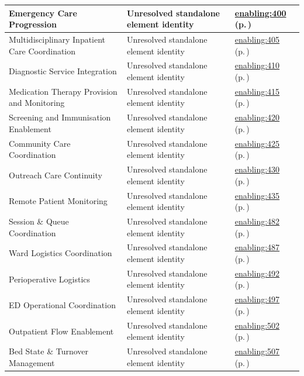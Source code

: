 \begin{longtable}{|>{\raggedright\arraybackslash}p{0.38\TableWidth}|>{\raggedright\arraybackslash}p{0.27\TableWidth}|>{\raggedright\arraybackslash}p{0.35\TableWidth}|}
Emergency Care Progression & Unresolved standalone element identity & \hyperref[rad:enabling:400]{enabling:400} (p.\,\pageref{rad:enabling:400})\\\hline
Multidisciplinary Inpatient Care Coordination & Unresolved standalone element identity & \hyperref[rad:enabling:405]{enabling:405} (p.\,\pageref{rad:enabling:405})\\\hline
Diagnostic Service Integration & Unresolved standalone element identity & \hyperref[rad:enabling:410]{enabling:410} (p.\,\pageref{rad:enabling:410})\\\hline
Medication Therapy Provision and Monitoring & Unresolved standalone element identity & \hyperref[rad:enabling:415]{enabling:415} (p.\,\pageref{rad:enabling:415})\\\hline
Screening and Immunisation Enablement & Unresolved standalone element identity & \hyperref[rad:enabling:420]{enabling:420} (p.\,\pageref{rad:enabling:420})\\\hline
Community Care Coordination & Unresolved standalone element identity & \hyperref[rad:enabling:425]{enabling:425} (p.\,\pageref{rad:enabling:425})\\\hline
Outreach Care Continuity & Unresolved standalone element identity & \hyperref[rad:enabling:430]{enabling:430} (p.\,\pageref{rad:enabling:430})\\\hline
Remote Patient Monitoring & Unresolved standalone element identity & \hyperref[rad:enabling:435]{enabling:435} (p.\,\pageref{rad:enabling:435})\\\hline
Session \& Queue Coordination & Unresolved standalone element identity & \hyperref[rad:enabling:482]{enabling:482} (p.\,\pageref{rad:enabling:482})\\\hline
Ward Logistics Coordination & Unresolved standalone element identity & \hyperref[rad:enabling:487]{enabling:487} (p.\,\pageref{rad:enabling:487})\\\hline
Perioperative Logistics & Unresolved standalone element identity & \hyperref[rad:enabling:492]{enabling:492} (p.\,\pageref{rad:enabling:492})\\\hline
ED Operational Coordination & Unresolved standalone element identity & \hyperref[rad:enabling:497]{enabling:497} (p.\,\pageref{rad:enabling:497})\\\hline
Outpatient Flow Enablement & Unresolved standalone element identity & \hyperref[rad:enabling:502]{enabling:502} (p.\,\pageref{rad:enabling:502})\\\hline
Bed State \& Turnover Management & Unresolved standalone element identity & \hyperref[rad:enabling:507]{enabling:507} (p.\,\pageref{rad:enabling:507})\\\hline

\end{longtable}
